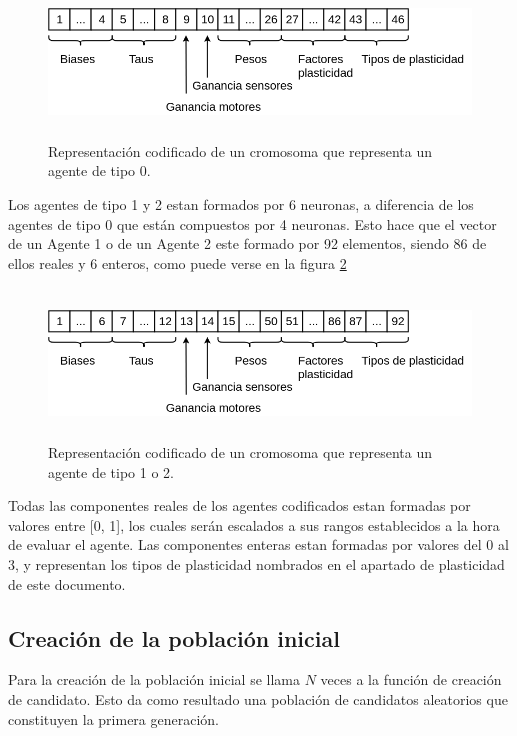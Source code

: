 \begin{figure}[H]
	\centering
	\includegraphics[width=1.0\textwidth,height=4cm]{Imagenes/vector0}
	\caption{Representación codificado de un cromosoma que representa un agente de tipo 0.}
	\label{fig:vector0}
\end{figure}

Los agentes de tipo 1 y 2 estan formados por 6 neuronas, a diferencia de los agentes de tipo 0 que están compuestos por 4 neuronas. Esto hace que el vector de un Agente 1 o de un Agente 2 este formado por 92 elementos, siendo 86 de ellos reales
y 6 enteros, como puede verse en la figura \ref{fig:vector12}

\begin{figure}[H]
	\centering
	\includegraphics[width=1.0\textwidth,height=4cm]{Imagenes/vector12}
	\caption{Representación codificado de un cromosoma que representa un agente de tipo 1 o 2.}
	\label{fig:vector12}
\end{figure}

Todas las componentes reales de los agentes codificados estan formadas por valores entre [0, 1], los cuales serán escalados a sus rangos establecidos a la hora de evaluar el agente. Las componentes enteras estan formadas por valores del 0 al 3, y
representan los tipos de plasticidad nombrados en el apartado de plasticidad de este documento.

\subsection{Creación de la población inicial}
Para la creación de la población inicial se llama $N$ veces a la función de creación de candidato. Esto da como resultado una población de candidatos aleatorios que constituyen la primera generación.

